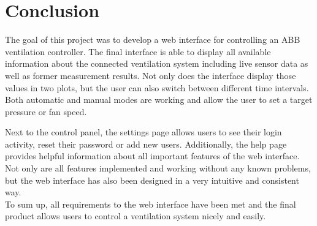 
\chapter{Conclusion}
\label{ch:conclusion}

The goal of this project was to develop a web interface for controlling an ABB ventilation controller. The final interface is able to display all available information about the connected ventilation system including live sensor data as well as former measurement results. Not only does the interface display those values in two plots, but the user can also switch between different time intervals. Both automatic and manual modes are working and allow the user to set a target pressure or fan speed. 

Next to the control panel, the settings page allows users to see their login activity, reset their password or add new users. Additionally, the help page provides helpful information about all important features of the web interface. Not only are all features implemented and working without any known problems, but the web interface has also been designed in a very intuitive and consistent way.\\

To sum up, all requirements to the web interface have been met and the final product allows users to control a ventilation system nicely and easily. 




